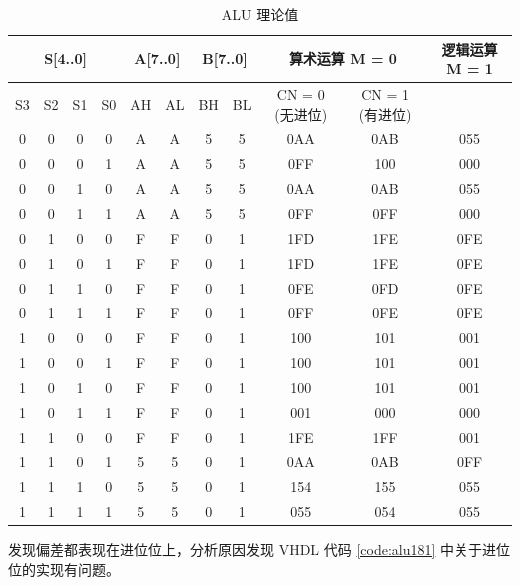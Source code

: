 \begin{enumerate}
    \begin{table}[H]
        \centering
        \begin{tabular}{|c c c c|c c|c c|c|c|c|}
            \hline
            \multicolumn{4}{|c|}{S[4..0]} & \multicolumn{2}{c|}{A[7..0]} & \multicolumn{2}{c}{B[7..0]} & \multicolumn{2}{|c|}{算术运算 M = 0} & 逻辑运算 M = 1 \\
            \hline
            S3 & S2 & S1 & S0 & AH & AL & BH & BL & CN = 0 (无进位) & CN = 1 (有进位) & \\
            \hline
            0 & 0 & 0 & 0 & A & A & 5 & 5 & 0AA & 0AB & \cellcolor[HTML]{FFF9C4}055 \\
            \hline
            0 & 0 & 0 & 1 & A & A & 5 & 5 & 0FF & 100 & \cellcolor[HTML]{FFF9C4}000 \\
            \hline
            0 & 0 & 1 & 0 & A & A & 5 & 5 & \cellcolor[HTML]{FFF9C4}0AA & \cellcolor[HTML]{FFF9C4}0AB & 055 \\
            \hline
            0 & 0 & 1 & 1 & A & A & 5 & 5 & 0FF & \cellcolor[HTML]{FFF9C4}0FF & 000 \\
            \hline
            0 & 1 & 0 & 0 & F & F & 0 & 1 & 1FD & 1FE & \cellcolor[HTML]{FFF9C4}0FE \\
            \hline
            0 & 1 & 0 & 1 & F & F & 0 & 1 & 1FD & 1FE & \cellcolor[HTML]{FFF9C4}0FE \\
            \hline
            0 & 1 & 1 & 0 & F & F & 0 & 1 & 0FE & 0FD & 0FE \\
            \hline
            0 & 1 & 1 & 1 & F & F & 0 & 1 & \cellcolor[HTML]{FFF9C4}0FF & \cellcolor[HTML]{FFF9C4}0FE & 0FE \\
            \hline
            1 & 0 & 0 & 0 & F & F & 0 & 1 & 100 & 101 & \cellcolor[HTML]{FFF9C4}001 \\
            \hline
            1 & 0 & 0 & 1 & F & F & 0 & 1 & 100 & 101 & \cellcolor[HTML]{FFF9C4}001 \\
            \hline
            1 & 0 & 1 & 0 & F & F & 0 & 1 & \cellcolor[HTML]{FFF9C4}100 & \cellcolor[HTML]{FFF9C4}101 & 001 \\
            \hline
            1 & 0 & 1 & 1 & F & F & 0 & 1 & 001 & 000 & 000 \\
            \hline
            1 & 1 & 0 & 0 & F & F & 0 & 1 & 1FE & 1FF & 001 \\
            \hline
            1 & 1 & 0 & 1 & 5 & 5 & 0 & 1 & 0AA & 0AB & \cellcolor[HTML]{FFF9C4}0FF \\
            \hline
            1 & 1 & 1 & 0 & 5 & 5 & 0 & 1 & \cellcolor[HTML]{FFF9C4}154 & \cellcolor[HTML]{FFF9C4}155 & 055 \\
            \hline
            1 & 1 & 1 & 1 & 5 & 5 & 0 & 1 & 055 & 054 & 055 \\
            \hline
        \end{tabular}
        \caption{ALU 理论值}
        \label{tab:addi3_2}
    \end{table}
    
    发现偏差都表现在进位位上，分析原因发现 VHDL 代码 \ref{code:alu181} 中关于进位位的实现有问题。
    
\end{enumerate}
